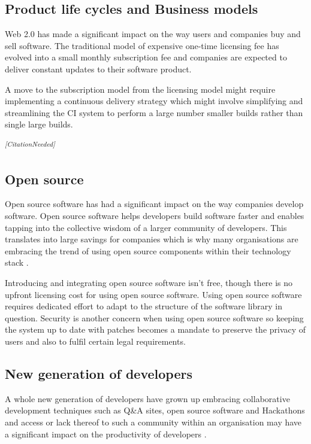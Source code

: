 \documentclass[10pt,conference]{IEEEtran}
\newcommand{\citationneeded}{\textsuperscript{\textit{[CitationNeeded]}}}
\begin{document}
\subsection*{Product life cycles and Business models}

Web 2.0 has made a significant impact on the way users and companies buy and sell software. The traditional model of expensive one-time licensing fee has evolved into a small monthly subscription fee and companies are expected to deliver constant updates to their software product. 


A move to the subscription model from the licensing model might require implementing a continuous delivery strategy which might involve simplifying and streamlining the CI system to perform a large number smaller builds rather than single large builds.

\citationneeded

\subsection*{Open source}

Open source software has had a significant impact on the way companies develop software. Open source software helps developers build software faster and enables tapping into the collective wisdom of a larger community of developers. This translates into large savings for companies which is why many organisations are embracing the trend of using open source components within their technology stack \cite{baldwin_4_2014} \cite{lemmens_open_2008}.

Introducing and integrating open source software isn't free, though there is no upfront licensing cost for using open source software. Using open source software requires dedicated effort to adapt to the structure of the software library in question. Security is another concern when using open source software so keeping the system up to date with patches becomes a mandate to preserve the privacy of users and also to fulfil certain legal requirements.

\subsection*{New generation of developers}

A whole new generation of developers have grown up embracing collaborative development techniques such as Q\&A sites, open source software and Hackathons and access or lack thereof to such a community within an organisation may have a significant impact on the productivity of developers \cite{vasilescu_continuous_2014}. 
\end{document}
